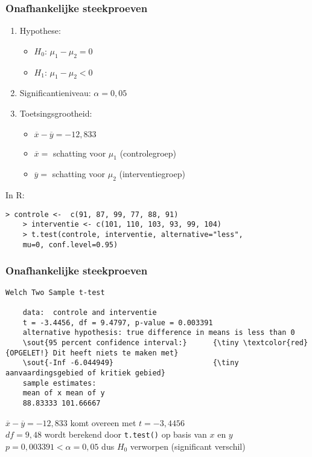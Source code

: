 \documentclass[aspectratio=169]{beamer}
\begin{document}
\begin{frame}[fragile]
  \frametitle{Onafhankelijke steekproeven}
  \begin{enumerate}
    \item Hypothese:
    \begin{itemize}
      \item $H_0$: $\mu_1 - \mu_2 = 0$
      \item $H_1$: $\mu_1 - \mu_2 < 0$
    \end{itemize}
    \item Significantieniveau: $\alpha = 0,05$
    \item Toetsingsgrootheid:
    \begin{itemize}
      \item $\overline{x}-\overline{y} = -12,833$
      \item $\overline{x} =$ schatting voor $\mu_1$ (controlegroep) 
      \item $\overline{y} =$ schatting voor $\mu_2$ (interventiegroep) 
    \end{itemize}
  \end{enumerate}
  \vfill
  In R:
  {\footnotesize
    \begin{Verbatim}[commandchars=\\\{\}]
    > controle <-  c(91, 87, 99, 77, 88, 91)
    > interventie <- c(101, 110, 103, 93, 99, 104)
    > t.test(controle, interventie, alternative="less",
    mu=0, conf.level=0.95)
    \end{Verbatim}
  }
\end{frame}

\begin{frame}[fragile]
  \frametitle{Onafhankelijke steekproeven}
  
  {\footnotesize
    \begin{Verbatim}[commandchars=\\\{\}]
    Welch Two Sample t-test
    
    data:  controle and interventie
    t = -3.4456, df = 9.4797, p-value = 0.003391
    alternative hypothesis: true difference in means is less than 0
    \sout{95 percent confidence interval:}      {\tiny \textcolor{red}{OPGELET!} Dit heeft niets te maken met}
    \sout{-Inf -6.044949}                       {\tiny   aanvaardingsgebied of kritiek gebied}
    sample estimates:
    mean of x mean of y 
    88.83333 101.66667
    \end{Verbatim}
  }
  \vfill
  $\overline{x}-\overline{y}=-12,833$ komt overeen met $t=-3,4456$\\
  $df=9,48$ wordt berekend door \texttt{t.test()} op basis van $x$ en $y$\\
  $p = 0,003391 < \alpha = 0,05$ dus $H_0$ verworpen (significant verschil)
\end{frame}
\end{document}
